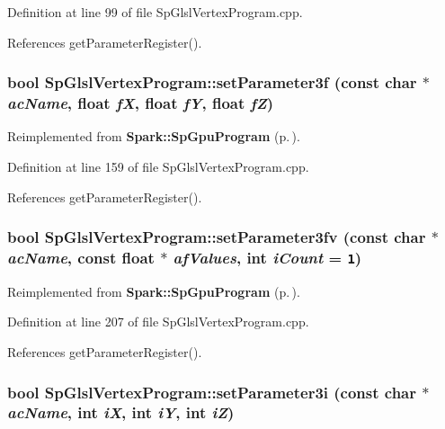 Definition at line 99 of file Sp\-Glsl\-Vertex\-Program.cpp.

References get\-Parameter\-Register().
\subsubsection{\setlength{\rightskip}{0pt plus 5cm}bool Sp\-Glsl\-Vertex\-Program::set\-Parameter3f (const char $\ast$ {\em ac\-Name}, float {\em f\-X}, float {\em f\-Y}, float {\em f\-Z})\hspace{0.3cm}{\tt  [virtual]}}\label{classSpark_1_1SpGlslVertexProgram_a11}




Reimplemented from {\bf Spark::Sp\-Gpu\-Program} {\rm (p.\,\pageref{classSpark_1_1SpGpuProgram_a22})}.

Definition at line 159 of file Sp\-Glsl\-Vertex\-Program.cpp.

References get\-Parameter\-Register().
\subsubsection{\setlength{\rightskip}{0pt plus 5cm}bool Sp\-Glsl\-Vertex\-Program::set\-Parameter3fv (const char $\ast$ {\em ac\-Name}, const float $\ast$ {\em af\-Values}, int {\em i\-Count} = {\tt 1})\hspace{0.3cm}{\tt  [virtual]}}\label{classSpark_1_1SpGlslVertexProgram_a15}




Reimplemented from {\bf Spark::Sp\-Gpu\-Program} {\rm (p.\,\pageref{classSpark_1_1SpGpuProgram_a26})}.

Definition at line 207 of file Sp\-Glsl\-Vertex\-Program.cpp.

References get\-Parameter\-Register().
\subsubsection{\setlength{\rightskip}{0pt plus 5cm}bool Sp\-Glsl\-Vertex\-Program::set\-Parameter3i (const char $\ast$ {\em ac\-Name}, int {\em i\-X}, int {\em i\-Y}, int {\em i\-Z})\hspace{0.3cm}{\tt  [virtual]}}\label{classSpark_1_1SpGlslVertexProgram_a3}




